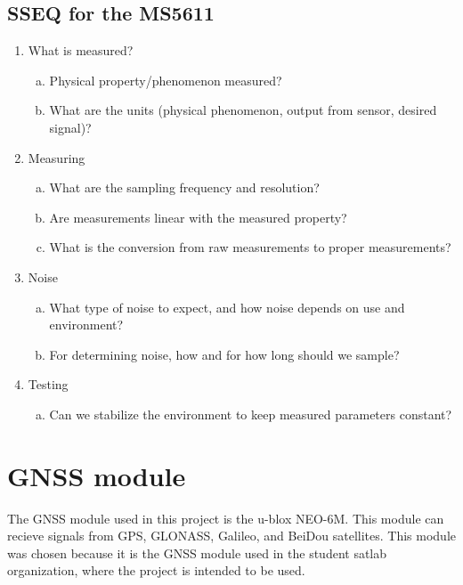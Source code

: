 \subsection{SSEQ for the MS5611}
\begin{enumerate}
\item What is measured?
    \begin{enumerate}[(a)]
        \item Physical property/phenomenon measured?
        \item What are the units (physical phenomenon, output from sensor, desired signal)?
    \end{enumerate}

\item Measuring
    \begin{enumerate}[(a)]
        \item What are the sampling frequency and resolution?
        \item Are measurements linear with the measured property?
        \item What is the conversion from raw measurements to proper measurements?
    \end{enumerate}
\item Noise
    \begin{enumerate}[(a)]
        \item What type of noise to expect, and how noise depends on use and environment?
        \item For determining noise, how and for how long should we sample?
    \end{enumerate}
\item Testing
    \begin{enumerate}[(a)]
        \item Can we stabilize the environment to keep measured parameters constant?
    \end{enumerate}
\end{enumerate}

\section{GNSS module }\label{sec:gnss-module}
The GNSS module used in this project is the u-blox NEO-6M.
This module can recieve signals from GPS, GLONASS, Galileo, and BeiDou satellites.
This module was chosen because it is the GNSS module used in the student satlab organization, where the project is intended to be used.

